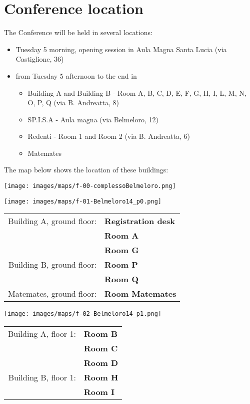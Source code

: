 \section*{Conference location}
The Conference will be held in several locations: 

\begin{itemize}
  \item Tuesday 5 morning, opening session in Aula Magna Santa Lucia (via Castiglione, 36)
  \item from Tuesday 5 afternoon to the end in
\begin{itemize}
\item Building A and Building B - Room A, B, C, D, E, F, G, H, I, L, M, N, O, P, Q (via B. Andreatta, 8)
\item SP.I.S.A - Aula magna (via Belmeloro, 12)
\item Redenti - Room 1 and Room 2 (via B. Andreatta, 6)
\item Matemates
\end{itemize}
\end{itemize}

\bigskip

\noindent The map below shows the location of these buildings:

\bigskip

\texttt{[image: images/maps/f-00-complessoBelmeloro.png]}

\newpage
\hspace*{-1cm}
\texttt{[image: images/maps/f-01-Belmeloro14\_p0.png]}
\vfill

\hfill
\colorbox{siamblue!50}{\large
\begin{tabular}{ r l }
  Building A, ground floor: & \textbf{Registration desk} \\
                            & \textbf{Room A} \\
                            & \textbf{Room G} \\
  Building B, ground floor: & \textbf{Room P} \\
                            & \textbf{Room Q} \\
  Matemates, ground floor:  & \textbf{Room Matemates}
\end{tabular}
}

\newpage
\hspace*{-1cm}
\texttt{[image: images/maps/f-02-Belmeloro14\_p1.png]}
\vfill

\hfill
\colorbox{siamblue!50}{\large
\begin{tabular}{ r l }
  Building A, floor 1: & \textbf{Room B} \\
                       & \textbf{Room C} \\
                       & \textbf{Room D} \\
  Building B, floor 1: & \textbf{Room H} \\
                       & \textbf{Room I}
\end{tabular}
}


